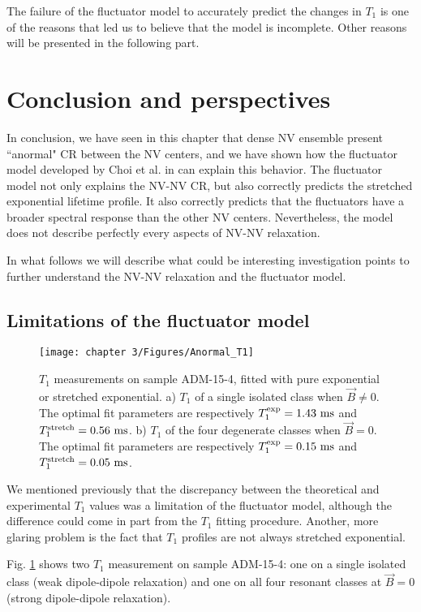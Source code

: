 \documentclass[a4paper, 11pt]{report}
\begin{document}
The failure of the fluctuator model to accurately predict the changes in $T_1$ is one of the reasons that led us to believe that the model is incomplete. Other reasons will be presented in the following part.

\section{Conclusion and perspectives}

In conclusion, we have seen in this chapter that dense NV ensemble present ``anormal" CR between the NV centers, and we have shown how the fluctuator model developed by Choi et al. in \citep{choi2017depolarization} can explain this behavior. The fluctuator model not only explains the NV-NV CR, but also correctly predicts the stretched exponential lifetime profile. It also correctly predicts that the fluctuators have a broader spectral response than the other NV centers. Nevertheless, the model does not describe perfectly every aspects of NV-NV relaxation.

In what follows we will describe what could be interesting investigation points to further understand the NV-NV relaxation and the fluctuator model.

\subsection{Limitations of the fluctuator model}
\begin{figure}[h]
\centering
\texttt{[image: chapter 3/Figures/Anormal\_T1]}
\caption{$T_1$ measurements on sample ADM-15-4, fitted with pure exponential or stretched exponential. a) $T_1$ of a single isolated class when $\vec{B} \neq 0$. The optimal fit parameters are respectively $T_1^{\rm exp}=1.43\ \rm ms$ and $T_1^{\rm stretch}=0.56\ \rm ms$. b) $T_1$ of the four degenerate classes when $\vec{B}=0$. The optimal fit parameters are respectively $T_1^{\rm exp}=0.15\ \rm ms$ and $T_1^{\rm stretch}=0.05\ \rm ms$.}
\label{anormal T1}
\end{figure}

We mentioned previously that the discrepancy between the theoretical and experimental $T_1$ values was a limitation of the fluctuator model, although the difference could come in part from the $T_1$ fitting procedure. Another, more glaring problem is the fact that $T_1$ profiles are not always stretched exponential.

Fig. \ref{anormal T1} shows two $T_1$ measurement on sample ADM-15-4: one on a single isolated class (weak dipole-dipole relaxation) and one on all four resonant classes at $\vec{B}=0$ (strong dipole-dipole relaxation).
\end{document}

